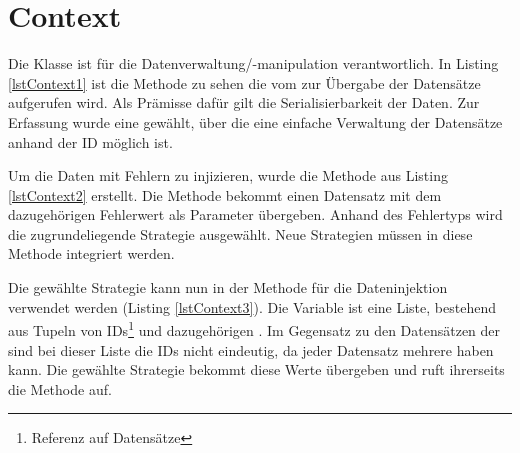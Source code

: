 \section{Context}

Die Klasse  ist f\"ur die Datenverwaltung/-manipulation verantwortlich. In Listing \ref{lstContext1} ist die Methode  zu sehen die vom  zur \"Ubergabe der Datens\"atze aufgerufen wird. Als Prämisse dafür gilt die Serialisierbarkeit der Daten. Zur Erfassung wurde eine  gewählt, über die eine einfache Verwaltung der Datensätze anhand der ID möglich ist.

\begin{figure}[!htb]
	
\end{figure}

Um die Daten mit Fehlern zu injizieren, wurde die Methode  aus Listing \ref{lstContext2} erstellt. Die Methode bekommt einen Datensatz mit dem dazugehörigen Fehlerwert als Parameter \"ubergeben. Anhand des Fehlertyps wird die zugrundeliegende Strategie ausgewählt. 
Neue Strategien müssen in diese Methode integriert werden.

\begin{figure}[!htb]
	
\end{figure}

Die gew\"ahlte Strategie kann nun in der Methode  f\"ur die Dateninjektion verwendet werden (Listing \ref{lstContext3}). Die Variable  ist eine Liste, bestehend aus Tupeln von IDs\footnote{Referenz auf Datensätze} und dazugeh\"origen . Im Gegensatz zu den Datens\"atzen der  sind bei dieser Liste die IDs nicht eindeutig, da jeder Datensatz mehrere  haben kann. Die gew\"ahlte Strategie bekommt diese Werte \"ubergeben und ruft ihrerseits die Methode  auf. 

\begin{figure}[!htb]
	
\end{figure}